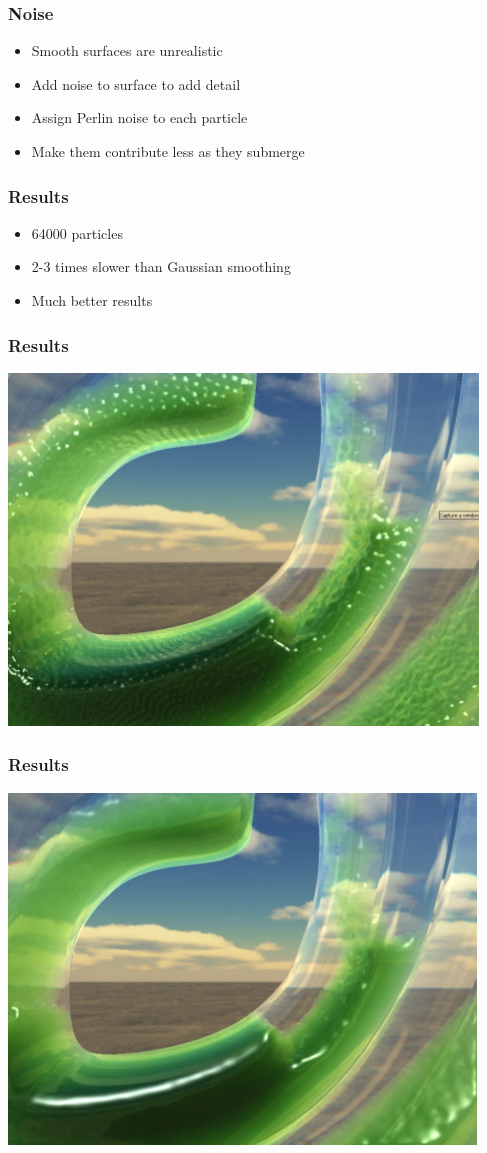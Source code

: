 \documentclass{beamer}
\begin{document}
	\begin{frame}[t]\frametitle{Noise}
	    \begin{itemize}
	    	\item Smooth surfaces are unrealistic
	    	\item Add noise to surface to add detail
	    	\item Assign Perlin noise to each particle
	    	\item Make them contribute less as they submerge
	    \end{itemize}
	\end{frame}
	\begin{frame}[t]\frametitle{Results}
	    \begin{itemize}
	    	\item 64000 particles
	    	\item 2-3 times slower than Gaussian smoothing
	    	\item Much better results
	    \end{itemize}
	\end{frame}
	\begin{frame}[t]\frametitle{Results}
	    \includegraphics[scale=.5]{gaussian.png}
	\end{frame}
	\begin{frame}[t]\frametitle{Results}
	    \includegraphics[scale=.5]{curveFlow.png}
	\end{frame}
\end{document}
